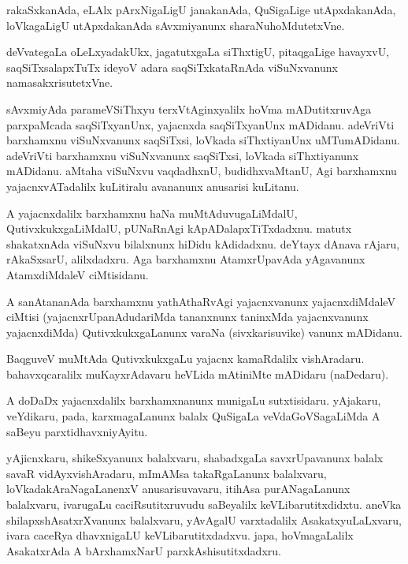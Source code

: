 \documentclass{article}
\begin{document}
\begin{mn}
rakaSxkanAda,  eLAlx  pArxNigaLigU  janakanAda,  QuSigaLige  utApxdakanAda,  
loVkagaLigU  utApxdakanAda  sAvxmiyanunx  sharaNuhoMdutetxVne.
\end{mn}

\begin{mn}
deVvategaLa  oLeLxyadakUkx,  jagatutxgaLa  siThxtigU,  pitaqgaLige  havayxvU,  
saqSiTxsalapxTuTx  ideyoV  adara  saqSiTxkataRnAda  viSuNxvanunx  namasakxrisutetxVne.
\end{mn}

\begin{mn}
sAvxmiyAda  parameVSiThxyu  terxVtAginxyalilx  hoVma mADutitxruvAga  parxpaMcada  
saqSiTxyanUnx,  yajacnxda  saqSiTxyanUnx  mADidanu.  adeVriVti  barxhamxnu  
viSuNxvanunx  saqSiTxsi,  loVkada  siThxtiyanUnx  uMTumADidanu.  adeVriVti  barxhamxnu  
viSuNxvanunx  saqSiTxsi,  loVkada  siThxtiyanunx  mADidanu.  aMtaha  viSuNxvu  vaqdadhxnU,  
budidhxvaMtanU,  Agi  barxhamxnu  yajacnxvATadalilx  kuLitiralu  avananunx  anusarisi  kuLitanu.
\end{mn}

\begin{mn}
A  yajacnxdalilx  barxhamxnu  haNa  muMtAduvugaLiMdalU,  QutivxkukxgaLiMdalU,  
pUNaRnAgi  kApADalapxTiTxdadxnu.  matutx  shakatxnAda  viSuNxvu  bilalxnunx  hiDidu  
kAdidadxnu.  deYtayx  dAnava  rAjaru,  rAkaSxsarU,  alilxdadxru.  Aga  barxhamxnu  
AtamxrUpavAda  yAgavanunx  AtamxdiMdaleV  ciMtisidanu.
\end{mn}

\begin{mn}
A sanAtananAda  barxhamxnu  yathAthaRvAgi  yajacnxvanunx  yajacnxdiMdaleV  ciMtisi 
(yajacnxrUpanAdudariMda  tananxnunx  taninxMda  yajacnxvanunx  yajacnxdiMda) 
QutivxkukxgaLanunx  varaNa (sivxkarisuvike) vanunx  mADidanu. 
\end{mn}

\begin{mn}
BaqguveV  muMtAda  QutivxkukxgaLu  yajacnx kamaRdalilx  vishAradaru.  bahavxqcaralilx  
muKayxrAdavaru  heVLida  mAtiniMte  mADidaru (naDedaru).
\end{mn}

\begin{mn}
A  doDaDx  yajacnxdalilx barxhamxnanunx  munigaLu  sutxtisidaru. yAjakaru, veYdikaru,  pada,  
karxmagaLanunx  balalx  QuSigaLa  veVdaGoVSagaLiMda  A  saBeyu  parxtidhavxniyAyitu.
\end{mn}

\begin{mn}
yAjicnxkaru,  shikeSxyanunx  balalxvaru,  shabadxgaLa  savxrUpavanunx balalx savaR  
vidAyxvishAradaru,  mImAMsa  takaRgaLanunx  balalxvaru,  loVkadakAraNagaLanenxV  
anusarisuvavaru,  itihAsa  purANagaLanunx  balalxvaru,  ivarugaLu  caciRsutitxruvudu  
saBeyalilx  keVLibarutitxdidxtu.  aneVka  shilapxshAsatxrXvanunx  balalxvaru,  yAvAgalU  
varxtadalilx  AsakatxyuLaLxvaru,  ivara  caceRya  dhavxnigaLU  keVLibarutitxdadxvu.  
japa,  hoVmagaLalilx  AsakatxrAda  A  bArxhamxNarU  parxkAshisutitxdadxru. 
\end{mn}
\end{document}
